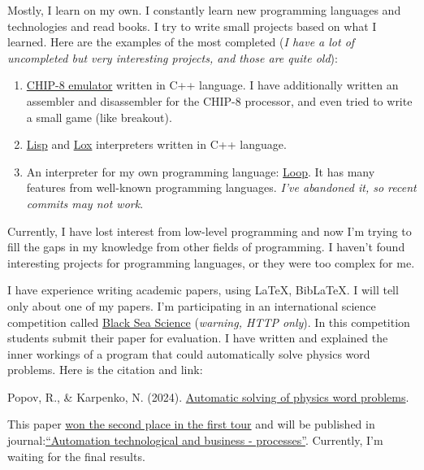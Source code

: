 \documentclass{article}
\newenvironment{block}%
{\list{}{\leftmargin=0.0in\rightmargin=0.0in}  \item[]  }%
{\endlist}
\begin{document}
	Mostly, I learn on my own. I constantly learn new programming languages and technologies and read books. I try to write small projects based on what I learned. Here are the examples of the most completed (\textit{I have a lot of uncompleted but very interesting projects, and those are quite old}):
	\begin{enumerate}
		\item \href{https://github.com/InAnYan/chip8}{CHIP-8 emulator} written in C++ language. I have additionally written an assembler and disassembler for the CHIP-8 processor, and even tried to write a small game (like breakout).
		\item \href{https://github.com/InAnYan/LispCpp}{Lisp} and \href{https://github.com/InAnYan/LoxCpp}{Lox} interpreters written in C++ language.
		\item An interpreter for my own programming language: \href{https://github.com/InAnYan/Loop}{Loop}. It has many features from well-known programming languages. \textit{I've abandoned it, so recent commits may not work}.
	\end{enumerate}
	
	Currently, I have lost interest from low-level programming and now I'm trying to fill the gaps in my knowledge from other fields of programming. I haven't found interesting projects for programming languages, or they were too complex for me.
	
	I have experience writing academic papers, using \LaTeX, BibLaTeX. I will tell only about one of my papers. I'm participating in an international science competition called \href{http://isc.ontu.edu.ua/?lang=en}{Black Sea Science} (\textit{warning, HTTP only}). In this competition students submit their paper for evaluation. I have written and explained the inner workings of a program that could automatically solve physics word problems. Here is the citation and link:
	
	\begin{block}
		Popov, R., \& Karpenko, N. (2024). \href{https://github.com/InAnYan/papers/blob/main/PhysicsSolver/Paper.pdf}{Automatic solving of physics word problems}.
	\end{block}
	
	This paper \href{http://isc.ontu.edu.ua/wp-content/uploads/sites/50/2024/03/2024-1-IT.pdf}{won the second place in the first tour} and will be published in journal:\href{https://atbp.ontu.edu.ua/en/site/page/journal}{\enquote{Automation technological and business - processes}}. Currently, I'm waiting for the final results.
	
\end{document}
